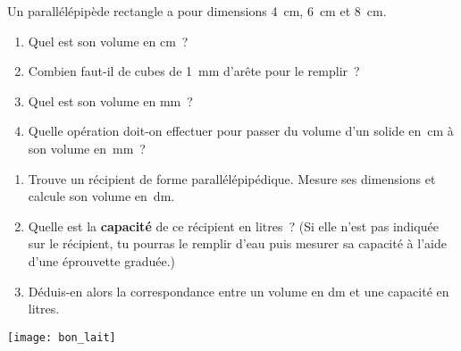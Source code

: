\begin{activite}[Conversions]

\begin{partie}
Un parallélépipède rectangle a pour dimensions 4 cm, 6 cm et 8 cm.
\begin{enumerate}
 \item Quel est son volume en cm ?
 \item Combien faut-il de cubes de 1 mm d'arête pour le remplir ?
 \item Quel est son volume en mm ?
 \item Quelle opération doit-on effectuer pour passer du volume d'un solide en cm à son volume en mm ?
 \end{enumerate}
\end{partie}

\begin{minipage}[c]{0.8\linewidth}
\begin{partie}
\begin{enumerate}
 \item Trouve un récipient de forme parallélépipédique. Mesure ses dimensions et calcule son volume en dm.
 \item Quelle est la \textbf{capacité} de ce récipient en litres ? (Si elle n'est pas indiquée sur le récipient, tu pourras le remplir d'eau puis mesurer sa capacité à l'aide d'une éprouvette graduée.)
 \item Déduis-en alors la correspondance entre un volume en dm et une capacité en litres.
 \end{enumerate}
\end{partie}
 \end{minipage} \hfill%
\begin{minipage}[c]{0.16\linewidth}
 \texttt{[image: bon\_lait]}
\end{minipage} \\

\end{activite}

